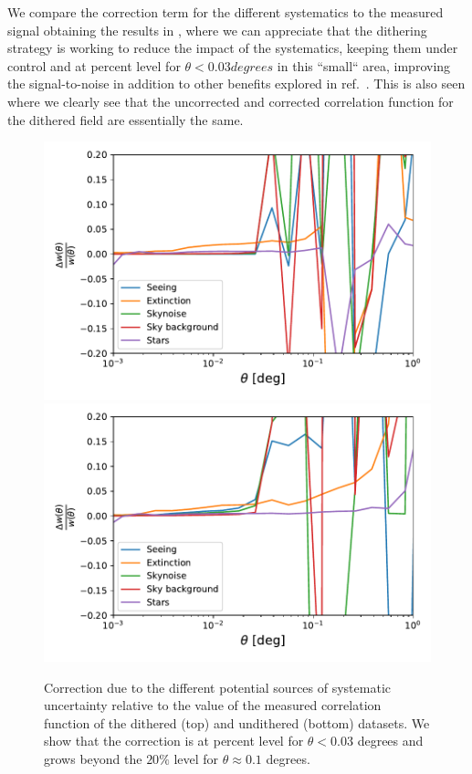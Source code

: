 \documentclass[\docopts]{\docclass}
\begin{document}
We compare the correction term for the different systematics to the measured signal obtaining the results in , where we can appreciate that the dithering strategy is working to reduce the impact of the systematics, keeping them under control and at percent level for $\theta < 0.03 degrees$ in this ``small`` area, improving the signal-to-noise in addition to other benefits explored in ref.~\citep{2016ApJ...829...50A}. This is also seen  where we clearly see that the uncorrected and corrected correlation function for the dithered field are essentially the same.
\begin{figure}
\centering
\includegraphics[width=0.9\columnwidth]{sys_dithered_25p3_v2.pdf}
\includegraphics[width=0.9\columnwidth]{sys_undithered_25p3_v2.pdf}
\caption{Correction due to the different potential sources of systematic uncertainty relative to the value of the measured correlation function of the dithered (top) and undithered (bottom) datasets. We show that the correction is at percent level for $\theta<0.03$ degrees and grows beyond the $20\%$ level for $\theta \approx 0.1$ degrees.}
\label{fig:sys_realspace}
\end{figure}
\end{document}
